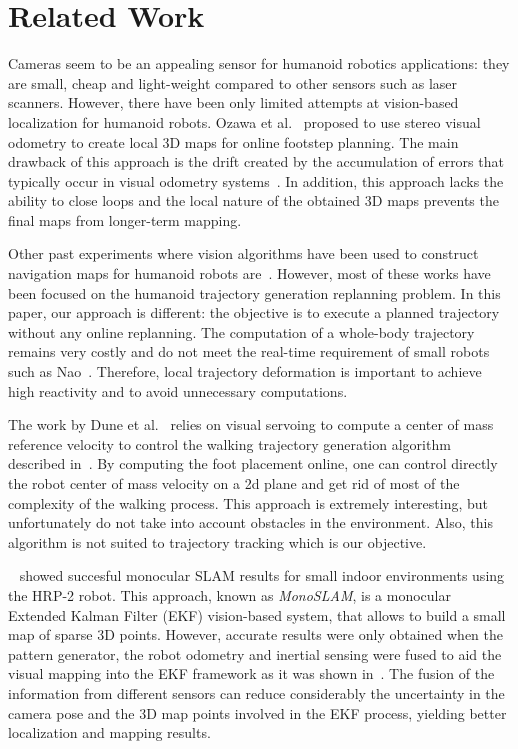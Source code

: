 \section{Related Work}\label{sec:related}

Cameras seem to be an appealing sensor for humanoid robotics
applications: they are small, cheap and light-weight compared to other
sensors such as laser scanners. However, there have been only limited
attempts at vision-based localization for humanoid robots. Ozawa et
al.~\cite{Ozawa05smc} proposed to use stereo visual odometry to create
local 3D maps for online footstep planning. The main drawback of this
approach is the drift created by the accumulation of errors that
typically occur in visual odometry
systems~\cite{Nister04cvpr,Kaess09icra}. In addition, this approach
lacks the ability to close loops and the local nature of the obtained
3D maps prevents the final maps from longer-term mapping.

Other past experiments where vision algorithms have been used to
construct navigation maps for humanoid robots
are~\cite{Michel05humanoids,Michel06icra,Chestnut10book}. However,
most of these works have been focused on the humanoid trajectory
generation replanning problem. In this paper, our approach is
different: the objective is to execute a planned trajectory without
any online replanning. The computation of a whole-body trajectory
remains very costly and do not meet the real-time requirement of small
robots such as Nao~\cite{wikipedia.nao}. Therefore, local trajectory
deformation is important to achieve high reactivity and to avoid
unnecessary computations.

The work by Dune et al.~\cite{Dune10iros} relies on visual servoing to
compute a center of mass reference velocity to control the walking
trajectory generation algorithm described in~\cite{Herdt10adr}. By
computing the foot placement online, one can control directly the
robot center of mass velocity on a 2d plane and get rid of most of the
complexity of the walking process. This approach is extremely
interesting, but unfortunately do not take into account obstacles in
the environment. Also, this algorithm is not suited to trajectory
tracking which is our objective.

~\citet{Davison07pami} showed succesful monocular SLAM results for
small indoor environments using the HRP-2 robot. This approach, known
as \textit{MonoSLAM}, is a monocular Extended Kalman Filter (EKF)
vision-based system, that allows to build a small map of sparse 3D
points. However, accurate results were only obtained when the pattern
generator, the robot odometry and inertial sensing were fused to aid
the visual mapping into the EKF framework as it was shown
in~\cite{Stasse06iros}. The fusion of the information from different
sensors can reduce considerably the uncertainty in the camera pose and
the 3D map points involved in the EKF process, yielding better
localization and mapping results.

